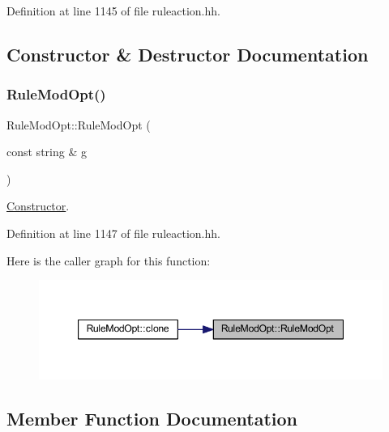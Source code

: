 Definition at line 1145 of file ruleaction.\+hh.



\subsection{Constructor \& Destructor Documentation}
\mbox{\label{class_rule_mod_opt_aaec9e4e9e933b3f20a795abe568141e5}} 
\subsubsection{\texorpdfstring{RuleModOpt()}{RuleModOpt()}}
{\footnotesize\ttfamily Rule\+Mod\+Opt\+::\+Rule\+Mod\+Opt (\begin{DoxyParamCaption}\item[{const string \&}]{g }\end{DoxyParamCaption})\hspace{0.3cm}{\ttfamily [inline]}}



\mbox{\hyperlink{class_constructor}{Constructor}}. 



Definition at line 1147 of file ruleaction.\+hh.

Here is the caller graph for this function\+:
\nopagebreak
\begin{figure}[H]
\begin{center}
\leavevmode
\includegraphics[width=347pt]{class_rule_mod_opt_aaec9e4e9e933b3f20a795abe568141e5_icgraph}
\end{center}
\end{figure}


\subsection{Member Function Documentation}
\mbox{\label{class_rule_mod_opt_ab868b1ba7b5ba982da1c316637d72c1e}} 
